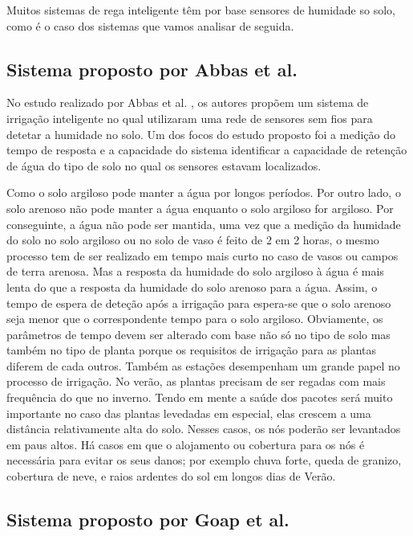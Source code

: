 \documentclass[conference]{IEEEtran}
\begin{document}
Muitos sistemas de rega inteligente têm por base sensores de humidade so solo, como 
é o caso dos sistemas que vamos analisar de seguida.

\subsection{Sistema proposto por Abbas et al.}

No estudo realizado por Abbas et al. \cite{abbas2014smart}, os autores propõem 
um sistema de irrigação inteligente no qual utilizaram uma rede de sensores sem 
fios para detetar a humidade no solo. Um dos focos do estudo proposto foi a medição 
do tempo de resposta e a capacidade do sistema identificar a capacidade de 
retenção de água do tipo de solo no qual os sensores estavam localizados. 

Como o solo argiloso pode manter a água por longos períodos. Por outro lado, 
o solo arenoso não pode manter a água enquanto o solo argiloso for argiloso. 
Por conseguinte, a água não pode ser mantida, uma vez que a medição da 
humidade do solo no solo argiloso ou no solo de vaso é feito de 2 em 2 horas, 
o mesmo processo tem de ser realizado em tempo mais curto no caso de vasos 
ou campos de terra arenosa. Mas a resposta da humidade do solo argiloso 
à água é mais lenta do que a resposta da humidade do solo arenoso para a água. 
Assim, o tempo de espera de deteção após a irrigação para espera-se que o solo 
arenoso seja menor que o correspondente tempo para o solo argiloso. Obviamente, 
os parâmetros de tempo devem ser alterado com base não só no tipo de solo mas 
também no tipo de planta porque os requisitos de irrigação para as plantas 
diferem de cada outros. Também as estações desempenham um grande papel no 
processo de irrigação. No verão, as plantas precisam de ser regadas com mais 
frequência do que no inverno. Tendo em mente a saúde dos pacotes será muito 
importante no caso das plantas levedadas em especial, elas crescem a uma 
distância relativamente alta do solo. Nesses casos, os nós poderão ser 
levantados em paus altos. Há casos em que o alojamento ou cobertura 
para os nós é necessária para evitar os seus danos; por exemplo 
chuva forte, queda de granizo, cobertura de neve, e raios ardentes 
do sol em longos dias de Verão. \cite{abbas2014smart}

\subsection{Sistema proposto por Goap et al.}
\end{document}
